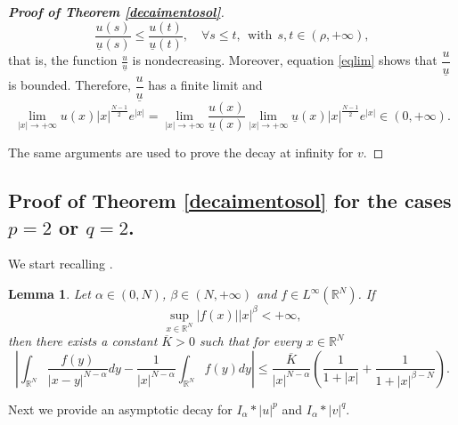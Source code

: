 \documentclass[12pt,a4paper]{article}
\newtheorem{lemma}[theorem]{Lemma}
\numberwithin{equation}{section}
\begin{document}
\begin{proof}[\textbf{Proof of Theorem \ref{decaimentosol}}]
    $$
    \dfrac{u(s)}{\underline{u}(s)} \leq \dfrac{u(t)}{\underline{u}(t)}, \quad \forall  s\leq t, \ \ \text{with} \ \ s,t \in (\rho, +\infty), 
    $$
    that is, the function $\frac{u}{\underline{u}}$ is nondecreasing. Moreover, equation \eqref{eqlim} shows that $\dfrac{u}{\underline{u}}$ is bounded. Therefore, $\dfrac{u}{\underline{u}}$ has a finite limit and 
    $$
    \lim\limits_{|x|\rightarrow +\infty} u(x)|x|^{\frac{N-1}{2}}e^{|x|} =  \lim\limits_{|x|\rightarrow +\infty} \dfrac{u(x)}{\underline{u}(x)} \lim\limits_{|x|\rightarrow +\infty} \underline{u}(x)|x|^{\frac{N-1}{2}}e^{|x|} \in (0, +\infty).
    $$
    
    \medbreak
    
      The same arguments are used to prove the decay at infinity for $v$. 
    \end{proof}


\subsection{Proof of Theorem \ref{decaimentosol} for the cases $p=2$ or $q=2$.}\label{sec2}
We start recalling \cite[Lemma 6.2]{Moroz2013}.

\begin{lemma}\label{auxiliar} 
Let $\alpha\in(0, N)$, $\beta \in (N, +\infty)$ and $f\in L^\infty(\mathbb{R}^N)$. If
$$
\sup\limits_{x\in \mathbb{R}^N} |f(x)||x|^\beta < +\infty,
$$
then there exists a constant $\overline{K}>0$ such that for every $x\in \mathbb{R}^N$
$$
\left| \int_{\mathbb{R}^N} \dfrac{f(y)}{|x-y|^{N-\alpha}} dy - \dfrac{1}{|x|^{N-\alpha}}\int_{\mathbb{R}^N} f(y) dy \right| \leq \dfrac{\overline{K}}{|x|^{N-\alpha}}\left(\dfrac{1}{1+|x|}+\dfrac{1}{1+|x|^{\beta -N}}\right).
$$
\end{lemma}

\medbreak 
Next we provide an asymptotic decay for $I_\alpha\ast |u|^p$ and $I_\alpha\ast |v|^q$. 
\end{document}
